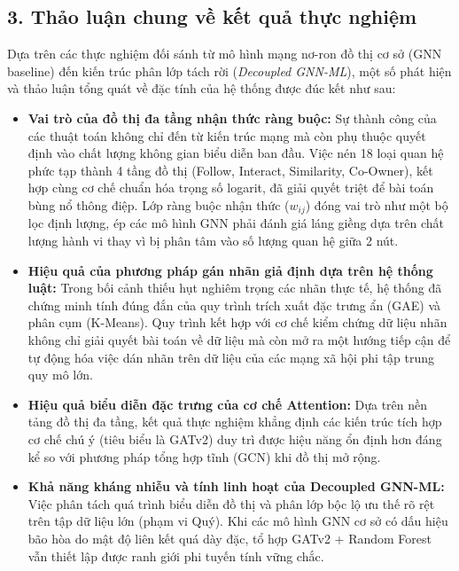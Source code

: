 \subsection{3. Thảo luận chung về kết quả thực nghiệm}

\indent\indent Dựa trên các thực nghiệm đối sánh từ mô hình mạng nơ-ron đồ thị cơ sở (GNN baseline) đến kiến trúc phân lớp tách rời (\textit{Decoupled GNN-ML}), một số phát hiện và thảo luận tổng quát về đặc tính của hệ thống được đúc kết như sau:

\begin{itemize}[label={--}, itemsep=1pt]
    \item \textbf{Vai trò của đồ thị đa tầng nhận thức ràng buộc:} Sự thành công của các thuật toán không chỉ đến từ kiến trúc mạng mà còn phụ thuộc quyết định vào chất lượng không gian biểu diễn ban đầu. Việc nén 18 loại quan hệ phức tạp thành 4 tầng đồ thị (Follow, Interact, Similarity, Co-Owner), kết hợp cùng cơ chế chuẩn hóa trọng số logarit, đã giải quyết triệt để bài toán bùng nổ thông điệp. Lớp ràng buộc nhận thức ($w_{ij}$) đóng vai trò như một bộ lọc định lượng, ép các mô hình GNN phải đánh giá láng giềng dựa trên chất lượng hành vi thay vì bị phân tâm vào số lượng quan hệ giữa 2 nút.

    \item \textbf{Hiệu quả của phương pháp gán nhãn giả định dựa trên hệ thống luật:} Trong bối cảnh thiếu hụt nghiêm trọng các nhãn thực tế, hệ thống đã chứng minh tính đúng đắn của quy trình trích xuất đặc trưng ẩn (GAE) và phân cụm (K-Means). Quy trình kết hợp với cơ chế kiểm chứng dữ liệu nhãn không chỉ giải quyết bài toán về dữ liệu mà còn mở ra một hướng tiếp cận để tự động hóa việc dán nhãn trên dữ liệu của các mạng xã hội phi tập trung quy mô lớn.

    \item \textbf{Hiệu quả biểu diễn đặc trưng của cơ chế Attention:} Dựa trên nền tảng đồ thị đa tầng, kết quả thực nghiệm khẳng định các kiến trúc tích hợp cơ chế chú ý (tiêu biểu là GATv2) duy trì được hiệu năng ổn định hơn đáng kể so với phương pháp tổng hợp tĩnh (GCN) khi đồ thị mở rộng.
    
    \item \textbf{Khả năng kháng nhiễu và tính linh hoạt của Decoupled GNN-ML:} Việc phân tách quá trình biểu diễn đồ thị và phân lớp bộc lộ ưu thế rõ rệt trên tập dữ liệu lớn (phạm vi Quý). Khi các mô hình GNN cơ sở có dấu hiệu bão hòa do mật độ liên kết quá dày đặc, tổ hợp GATv2 + Random Forest vẫn thiết lập được ranh giới phi tuyến tính vững chắc.


\end{itemize}
